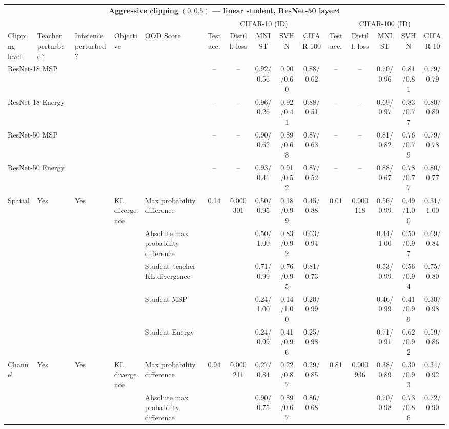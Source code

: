 \documentclass[border=2pt]{standalone}
\begin{document}
\scriptsize
\setlength{\tabcolsep}{4pt}
\begin{tabular}{lllllcccccccccc}
\multicolumn{15}{c}{\textbf{Aggressive clipping $(0, 0.5)$ --- linear student, ResNet-50 layer4}}\\[4pt]
\multicolumn{5}{c}{} & \multicolumn{5}{c}{CIFAR-10 (ID)} & \multicolumn{5}{c}{CIFAR-100 (ID)} \\
\cmidrule(lr){6-10} \cmidrule(lr){11-15}
\toprule
Clipping level & Teacher perturbed? & Inference perturbed? & Objective & OOD Score & Test acc. & Distill. loss & MNIST & SVHN & CIFAR-100 & Test acc. & Distill. loss & MNIST & SVHN & CIFAR-10 \\
\midrule
\multicolumn{5}{l}{ResNet-18 MSP} & -- & -- & 0.92/0.56 & 0.90/0.60 & 0.88/0.62 & -- & -- & 0.70/0.96 & 0.81/0.81 & 0.79/0.79 \\
\multicolumn{5}{l}{ResNet-18 Energy} & -- & -- & 0.96/0.26 & 0.92/0.41 & 0.88/0.51 & -- & -- & 0.69/0.97 & 0.83/0.77 & 0.80/0.80 \\
\multicolumn{5}{l}{ResNet-50 MSP} & -- & -- & 0.90/0.62 & 0.89/0.68 & 0.87/0.63 & -- & -- & 0.81/0.82 & 0.76/0.79 & 0.79/0.78 \\
\multicolumn{5}{l}{ResNet-50 Energy} & -- & -- & 0.93/0.41 & 0.91/0.52 & 0.87/0.52 & -- & -- & 0.88/0.67 & 0.78/0.77 & 0.80/0.77 \\
\midrule
Spatial & Yes & Yes & KL divergence & Max probability difference & 0.14 & 0.000301 & 0.50/0.95 & 0.18/0.99 & 0.45/0.88 & 0.01 & 0.000118 & 0.56/0.99 & 0.49/1.00 & 0.31/1.00 \\
 &  &  &  & Absolute max probability difference &  &  & 0.50/1.00 & 0.83/0.92 & 0.63/0.94 &  &  & 0.44/1.00 & 0.50/0.97 & 0.69/0.84 \\
 &  &  &  & Student--teacher KL divergence &  &  & 0.71/0.99 & 0.76/0.95 & 0.81/0.73 &  &  & 0.53/0.99 & 0.56/0.94 & 0.75/0.80 \\
 &  &  &  & Student MSP &  &  & 0.24/1.00 & 0.14/1.00 & 0.20/0.99 &  &  & 0.46/0.99 & 0.41/0.99 & 0.30/0.98 \\
 &  &  &  & Student Energy &  &  & 0.24/0.99 & 0.41/0.96 & 0.25/0.98 &  &  & 0.71/0.91 & 0.62/0.92 & 0.59/0.86 \\
\addlinespace
Channel & Yes & Yes & KL divergence & Max probability difference & 0.94 & 0.000211 & 0.27/0.84 & 0.22/0.87 & 0.29/0.85 & 0.81 & 0.000936 & 0.38/0.89 & 0.30/0.93 & 0.34/0.92 \\
 &  &  &  & Absolute max probability difference &  &  & 0.90/0.75 & 0.89/0.67 & 0.86/0.68 &  &  & 0.70/0.98 & 0.73/0.86 & 0.72/0.90 \\

\end{tabular}
\end{document}
